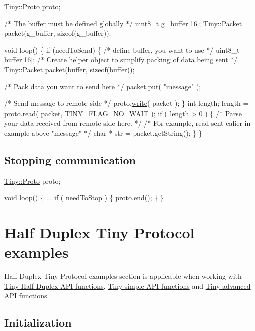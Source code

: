 \begin{DoxyCode}
\hyperlink{classTiny_1_1Proto}{Tiny::Proto} proto;

\textcolor{comment}{/* The buffer must be defined globally */}
uint8\_t g\_buffer[16];
\hyperlink{classTiny_1_1Packet}{Tiny::Packet} packet(g\_buffer, \textcolor{keyword}{sizeof}(g\_buffer));

\textcolor{keywordtype}{void} loop()
\{
    \textcolor{keywordflow}{if} (needToSend)
    \{
        \textcolor{comment}{/* define buffer, you want to use */}
        uint8\_t buffer[16];
        \textcolor{comment}{/* Create helper object to simplify packing of data being sent */}
        \hyperlink{classTiny_1_1Packet}{Tiny::Packet} packet(buffer, \textcolor{keyword}{sizeof}(buffer));

        \textcolor{comment}{/* Pack data you want to send here */}
        packet.put( \textcolor{stringliteral}{"message"} );

        \textcolor{comment}{/* Send message to remote side */}
        proto.\hyperlink{classTiny_1_1Proto_a46fbc8b8681431b9b0a9a4b953a8dc33}{write}( packet );
    \}
    \textcolor{keywordtype}{int} length;
    length = proto.\hyperlink{classTiny_1_1Proto_acc00ac10509eaa11a83b0b88a2278b3e}{read}( packet, \hyperlink{group__FLAGS__GROUP_gadadd60eb21d7949e6d097ad36aab9b2e}{TINY\_FLAG\_NO\_WAIT} );
    \textcolor{keywordflow}{if} ( length > 0 )
    \{
        \textcolor{comment}{/* Parse your data received from remote side here. */}
        \textcolor{comment}{/* For example, read sent ealier in example above "message" */}
        \textcolor{keywordtype}{char} * str = packet.getString();
    \}
\}
\end{DoxyCode}
\hypertarget{arduino_arduino_tiny_close}{}\subsection{Stopping communication}\label{arduino_arduino_tiny_close}

\begin{DoxyCode}
\hyperlink{classTiny_1_1Proto}{Tiny::Proto} proto;

\textcolor{keywordtype}{void} loop()
\{
    ...
    \textcolor{keywordflow}{if} ( needToStop )
    \{
        proto.\hyperlink{classTiny_1_1Proto_ae9f52fa1c4f18981672ad7af12633d4e}{end}();
    \}
\}
\end{DoxyCode}
\hypertarget{arduino_arduino_tiny_hd}{}\section{Half Duplex Tiny Protocol examples}\label{arduino_arduino_tiny_hd}
Half Duplex Tiny Protocol examples section is applicable when working with \hyperlink{group__HALF__DUPLEX__API}{Tiny Half Duplex A\+PI functions}, \hyperlink{group__SIMPLE__API}{Tiny simple A\+PI functions} and \hyperlink{group__ADVANCED__API}{Tiny advanced A\+PI functions}.\hypertarget{arduino_arduino_tiny_hd_init}{}\subsection{Initialization}\label{arduino_arduino_tiny_hd_init}

